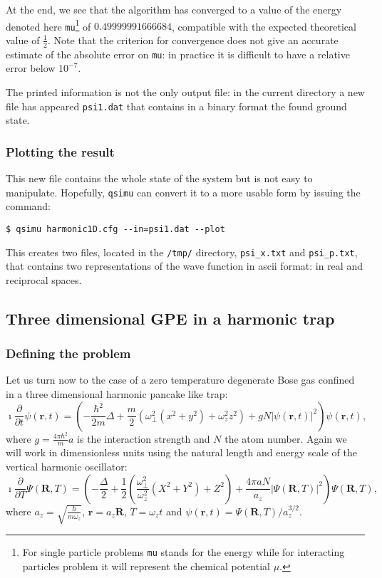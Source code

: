 \documentclass[12pt,a4paper]{report}
\newcommand{\abs}[1]{\left|#1\right|}
\newcommand{\qsimu}{\texttt{qsimu}{} }
\begin{document}
At the end, we see that the algorithm has converged to a value of the energy denoted here \texttt{mu}\footnote{For single particle problems \texttt{mu} stands for the energy while for interacting particles problem it will represent the chemical potential $\mu$.} of $0.49999991666684$, compatible with the expected theoretical value of $\frac{1}{2}$.
Note that the criterion for convergence does not give an accurate estimate of the absolute error on \texttt{mu}: in practice it is difficult to have a relative error below $10^{-7}$.

The printed information is not the only output file: in the current directory a new file has appeared \texttt{psi1.dat} that contains in a binary format the found ground state.

\subsubsection{Plotting the result}
This new file contains the whole state of the system but is not easy to manipulate.
Hopefully, \qsimu can convert it to a more usable form by issuing the command:
\begin{verbatim}
$ qsimu harmonic1D.cfg --in=psi1.dat --plot
\end{verbatim}
This creates two files, located in the \texttt{/tmp/} directory, \texttt{psi\_x.txt} and \texttt{psi\_p.txt}, that contains two representations of the wave function in ascii format: in real and reciprocal spaces.


\subsection{Three dimensional GPE in a harmonic trap}
\subsubsection{Defining the problem}
Let us turn now to the case of a zero temperature degenerate Bose gas confined in a three dimensional harmonic pancake like trap:
\begin{equation}
\imath\frac{\partial}{\partial t}\psi(\bm{r},t)=
\left(-\frac{\hbar^2}{2m}\Delta+\frac{m}{2}(\omega_\perp^2(x^2+y^2)+\omega_z^2z^2)
+gN\abs{\psi(\bm{r},t)}^2\right)\psi(\bm{r},t),
\end{equation}
where $g=\frac{4\pi\hbar^2}{m}a$ is the interaction strength and $N$ the atom number.
Again we will work in dimensionless units using the natural length and energy scale of the vertical harmonic oscillator:
\begin{equation}
\imath\frac{\partial}{\partial T}\Psi(\bm{R},T)=\left(-\frac{\Delta}{2}
+\frac{1}{2}\left(\frac{\omega_\perp^2}{\omega_z^2}(X^2+Y^2)+Z^2\right)
+\frac{4\pi aN}{a_z}\abs{\Psi(\bm{R},T)}^2\right)\Psi(\bm{R},T),
\label{eqn:3dlgpe}
\end{equation}
where $a_z=\sqrt{\frac{\hbar}{m\omega_z}}$, $\bm{r}=a_z\bm{R}$, $T=\omega_zt$ and $\psi(\bm{r},t)=\Psi(\bm{R},T)/a_z^{3/2}$.
\end{document}
